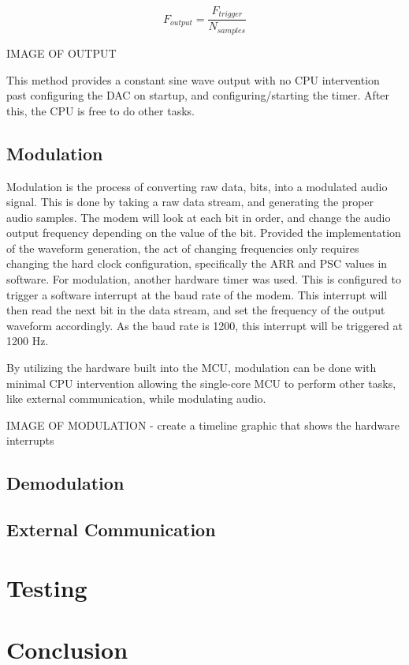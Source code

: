 \documentclass{journal}
\begin{document}
\[
  F_{output} = \frac{F_{trigger}}{N_{samples}}
\]

IMAGE OF OUTPUT

This method provides a constant sine wave output with no CPU intervention past configuring the DAC on startup, and configuring/starting the timer. After this, the CPU is free to do other tasks.

\subsection{Modulation}

Modulation is the process of converting raw data, bits, into a modulated audio signal. This is done by taking a raw data stream, and generating the proper audio samples. The modem will look at each bit in order, and change the audio output frequency depending on the value of the bit. Provided the implementation of the waveform generation, the act of changing frequencies only requires changing the hard clock configuration, specifically the ARR and PSC values in software. For modulation, another hardware timer was used. This is configured to trigger a software interrupt at the baud rate of the modem. This interrupt will then read the next bit in the data stream, and set the frequency of the output waveform accordingly. As the baud rate is 1200, this interrupt will be triggered at 1200 Hz.

By utilizing the hardware built into the MCU, modulation can be done with minimal CPU intervention allowing the single-core MCU to perform other tasks, like external communication, while modulating audio.

IMAGE OF MODULATION - create a timeline graphic that shows the hardware interrupts

\subsection{Demodulation}

\subsection{External Communication}

\section{Testing}

\section{Conclusion}



\end{document}
